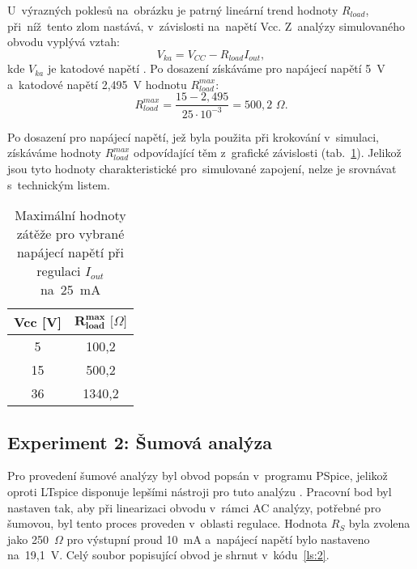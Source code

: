\documentclass[12pt]{CLASS/protokol}
\begin{document}
        \par
        U~výrazných poklesů na~obrázku je patrný lineární trend hodnoty $R_{load}$, při~níž~tento zlom nastává, v~závislosti na~napětí Vcc. Z~analýzy simulovaného obvodu vyplývá vztah:
        \begin{equation}\label{eq:Rmax}
            V_{ka}=V_{CC}-R_{load}I_{out},
        \end{equation}
        kde $V_{ka}$ je katodové napětí \cite{Svoboda2014}. Po dosazení získáváme pro napájecí napětí 5~V a~katodové napětí 2,495~V hodnotu $R_{load}^{max}$:
        \begin{equation}
            R_{load}^{max} = \frac{15-2,495}{25\cdot 10^{-3}} = 500,2\text{~}\Omega.
        \end{equation}

        \par
        Po dosazení pro napájecí napětí, jež byla použita při krokování v~simulaci, získáváme hodnoty $R_{load}^{max}$ odpovídající těm z~grafické závislosti (tab.~\ref{tab:1b}). Jelikož jsou tyto hodnoty charakteristické pro~simulované zapojení, nelze je srovnávat s~technickým listem.

        \begin{table}[]
        \centering
        \caption{Maximální hodnoty zátěže pro vybrané napájecí napětí při regulaci $I_{out}$ na~25~mA}
        \label{tab:1b}
        \begin{tabular}{cc}
        \textbf{Vcc {[}V{]}} & \textbf{$\mathbf{R_{load}^{max}} \textbf{~[}\Omega\textbf{]}$} \\ \hline
        5                    & 100,2                     \\
        15                   & 500,2                     \\
        36                   & 1340,2                   
        \end{tabular}
        \end{table}
    
    \newpage    
    \subsection{Experiment 2: Šumová analýza}\label{subsec:2}
        Pro provedení šumové analýzy byl obvod popsán v~programu PSpice, jelikož oproti LTspice disponuje lepšími nástroji pro tuto analýzu \cite{pspice}. Pracovní bod byl nastaven tak, aby při linearizaci obvodu v~rámci AC analýzy, potřebné pro šumovou, byl tento proces proveden v~oblasti regulace. Hodnota $R_S$ byla zvolena jako 250~$\Omega$ pro výstupní proud 10~mA a~napájecí napětí bylo nastaveno na~19,1~V. Celý soubor popisující obvod je shrnut v~kódu~\ref{ls:2}.
\end{document}
